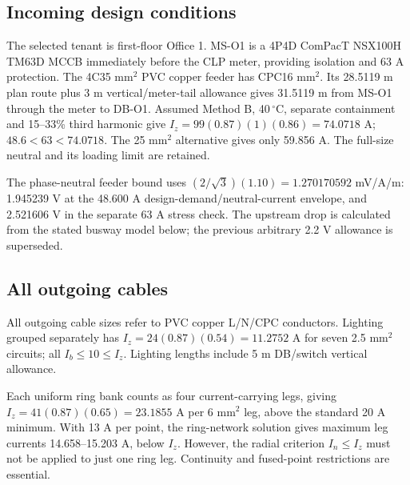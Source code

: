 \subsection*{Incoming design conditions}
The selected tenant is first-floor Office 1. MS-O1 is a 4P4D ComPacT NSX100H TM63D MCCB immediately before the CLP meter, providing isolation and 63 A protection. The 4C35 mm$^2$ PVC copper feeder has CPC16 mm$^2$. Its 28.5119 m plan route plus 3 m vertical/meter-tail allowance gives 31.5119 m from MS-O1 through the meter to DB-O1. Assumed Method B, 40\,$^\circ$C, separate containment and 15--33\% third harmonic give $I_z=99(0.87)(1)(0.86)=74.0718$ A; $48.6<63<74.0718$. The 25 mm$^2$ alternative gives only 59.856 A. The full-size neutral and its loading limit are retained.

The phase-neutral feeder bound uses $(2/\sqrt3)(1.10)=1.270170592$ mV/A/m: 1.945239 V at the 48.600 A design-demand/neutral-current envelope, and 2.521606 V in the separate 63 A stress check. The upstream drop is calculated from the stated busway model below; the previous arbitrary 2.2 V allowance is superseded.

\subsection*{All outgoing cables}
All outgoing cable sizes refer to PVC copper L/N/CPC conductors. Lighting grouped separately has $I_z=24(0.87)(0.54)=11.2752$ A for seven 2.5 mm$^2$ circuits;  all $I_b\le 10\le I_z$. Lighting lengths include 5 m DB/switch vertical allowance.

Each uniform ring bank counts as four current-carrying legs, giving $I_z=41(0.87)(0.65)=23.1855$ A per 6 mm$^2$ leg, above the standard 20 A minimum. With 13 A per point, the ring-network solution gives maximum leg currents 14.658--15.203 A, below $I_z$. However, the radial criterion $I_n\le I_z$ must not be applied to just one ring leg. Continuity and fused-point restrictions are essential.

